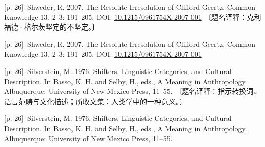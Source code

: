 \documentclass[10pt,a4paper]{article}
\begin{document}
\noindent\begin{minipage}{\textwidth}\begin{minipage}[t]{\dimexpr.5\textwidth-4mm\relax}\noindent\begin{minipage}[t]{\linewidth}{\scriptsize\color{gray} [p. 26]}\ Shweder, R. 2007. The Resolute Irresolution of Clifford Geertz. Common Knowledge 13, 2–3: 191–205. DOI: \url{10.1215/0961754X-2007-001} 〔题名译释：克利福德·格尔茨坚定的不坚定。〕\par\end{minipage}\par\end{minipage}\hfill\begin{minipage}[t]{\dimexpr.5\textwidth-4mm\relax}\noindent\begin{minipage}[t]{\linewidth}{\scriptsize\color{gray} [p. 26]}\ Shweder, R. 2007. The Resolute Irresolution of Clifford Geertz. Common Knowledge 13, 2–3: 191–205. DOI: \url{10.1215/0961754X-2007-001}\par\end{minipage}\par\end{minipage}\end{minipage}\par
\noindent\begin{minipage}{\textwidth}\begin{minipage}[t]{\dimexpr.5\textwidth-4mm\relax}\noindent\begin{minipage}[t]{\linewidth}{\scriptsize\color{gray} [p. 26]}\ Silverstein, M. 1976. Shifters, Linguistic Categories, and Cultural Description. In Basso, K. H. and Selby, H., eds., A Meaning in Anthropology. Albuquerque: University of New Mexico Press, 11–55. 〔题名译释：指示转换词、语言范畴与文化描述；所收文集：人类学中的一种意义。〕\par\end{minipage}\par\end{minipage}\hfill\begin{minipage}[t]{\dimexpr.5\textwidth-4mm\relax}\noindent\begin{minipage}[t]{\linewidth}{\scriptsize\color{gray} [p. 26]}\ Silverstein, M. 1976. Shifters, Linguistic Categories, and Cultural Description. In Basso, K. H. and Selby, H., eds., A Meaning in Anthropology. Albuquerque: University of New Mexico Press, 11–55.\par\end{minipage}\par\end{minipage}\end{minipage}\par
\end{document}
